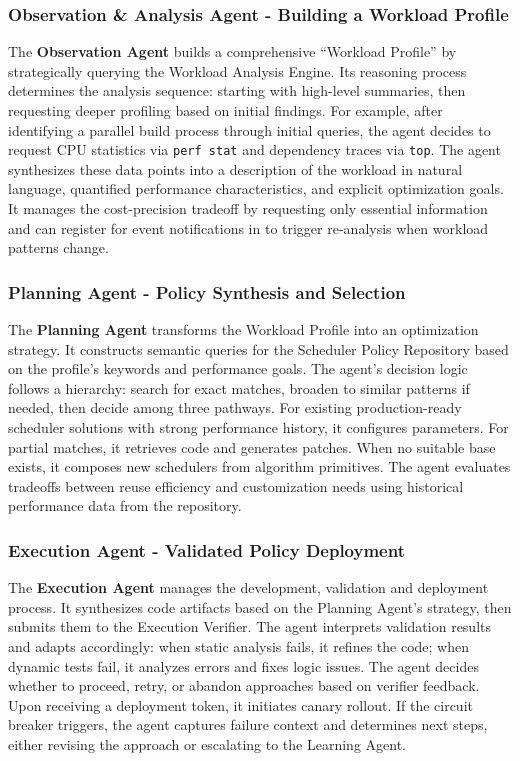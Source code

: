 \subsubsection{Observation \& Analysis Agent - Building a Workload Profile}

The \textbf{Observation Agent} builds a comprehensive ``Workload Profile'' by strategically querying the Workload Analysis Engine. Its reasoning process determines the analysis sequence: starting with high-level summaries, then requesting deeper profiling based on initial findings. For example, after identifying a parallel build process through initial queries, the agent decides to request CPU statistics via \texttt{perf stat} and dependency traces via \texttt{top}. The agent synthesizes these data points into a description of the workload in natural language, quantified performance characteristics, and explicit optimization goals. It manages the cost-precision tradeoff by requesting only essential information and can register for event notifications in \sys to trigger re-analysis when workload patterns change.

\subsubsection{Planning Agent - Policy Synthesis and Selection}

The \textbf{Planning Agent} transforms the Workload Profile into an optimization strategy. It constructs semantic queries for the Scheduler Policy Repository based on the profile's keywords and performance goals. The agent's decision logic follows a hierarchy: search for exact matches, broaden to similar patterns if needed, then decide among three pathways. For existing production-ready scheduler solutions with strong performance history, it configures parameters. For partial matches, it retrieves code and generates patches. When no suitable base exists, it composes new schedulers from algorithm primitives. The agent evaluates tradeoffs between reuse efficiency and customization needs using historical performance data from the repository.

\subsubsection{Execution Agent - Validated Policy Deployment}

The \textbf{Execution Agent} manages the development, validation and deployment process. It synthesizes code artifacts based on the Planning Agent's strategy, then submits them to the Execution Verifier. The agent interprets validation results and adapts accordingly: when static analysis fails, it refines the code; when dynamic tests fail, it analyzes errors and fixes logic issues. The agent decides whether to proceed, retry, or abandon approaches based on verifier feedback. Upon receiving a deployment token, it initiates canary rollout. If the circuit breaker triggers, the agent captures failure context and determines next steps, either revising the approach or escalating to the Learning Agent.

